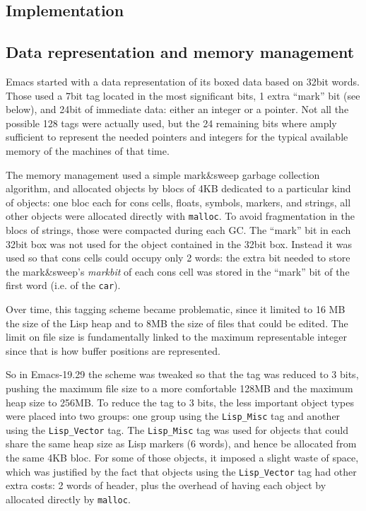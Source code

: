 \documentclass[format=acmsmall, review=false, screen=true]{acmart}
\begin{document}
\subsection{Implementation}


\subsection{Data representation and memory management}

Emacs started with a data representation of its boxed data based on 32bit
words.  Those used a 7bit tag located in the most significant bits, 1 extra
``mark'' bit (see below), and 24bit of immediate data: either an integer or
a pointer.  Not all the possible 128 tags were actually used, but the 24
remaining bits where amply sufficient to represent the needed pointers and
integers for the typical available memory of the machines of that time.

The memory management used a simple mark\&sweep garbage collection
algorithm, and allocated objects by blocs of 4KB dedicated to a particular
kind of objects: one bloc each for cons cells, floats, symbols, markers, and
strings, all other objects were allocated directly with \texttt{malloc}.
To avoid fragmentation in the blocs of strings, those were compacted during
each GC.  The ``mark'' bit in each 32bit box was not used for the object
contained in the 32bit box.  Instead it was used so that cons cells could
occupy only 2 words: the extra bit needed to store the mark\&sweep's
\emph{markbit} of each cons cell was stored in the ``mark'' bit of the first
word (i.e. of the \texttt{car}).


Over time, this tagging scheme became problematic, since it limited to 16 MB
the size of the Lisp heap and to 8MB the size of files that could be edited.
The limit on file size is fundamentally linked to the maximum representable
integer since that is how buffer positions are represented.

So in Emacs-19.29 the scheme was tweaked so that the tag was reduced to
3 bits, pushing the maximum file size to a more comfortable 128MB and the
maximum heap size to 256MB.  To reduce the tag to 3 bits, the less important
object types were placed into two groups: one group using the
\texttt{Lisp\_Misc} tag and another using the \texttt{Lisp\_Vector} tag.
The \texttt{Lisp\_Misc} tag was used for objects that could share the same
heap size as Lisp markers (6 words), and hence be allocated from the same
4KB bloc.  For some of those objects, it imposed a slight waste of space,
which was justified by the fact that objects using the \texttt{Lisp\_Vector}
tag had other extra costs: 2 words of header, plus the overhead of having
each object by allocated directly by \texttt{malloc}.
\end{document}
